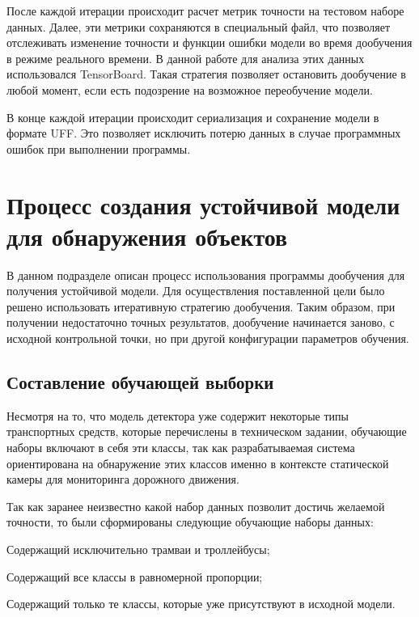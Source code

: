 После каждой итерации происходит расчет метрик точности на тестовом наборе данных. Далее, эти метрики сохраняются в специальный файл, что позволяет отслеживать изменение точности и функции ошибки модели во время дообучения в режиме реального времени. В данной работе для анализа этих данных использовался TensorBoard. Такая стратегия позволяет остановить дообучение в любой момент, если есть подозрение на возможное переобучение модели. 

В конце каждой итерации происходит сериализация и сохранение модели в формате UFF. Это позволяет исключить потерю данных в случае программных ошибок при выполнении программы.

\section{Процесс создания устойчивой модели для обнаружения объектов}

В данном подразделе описан процесс использования программы дообучения для получения устойчивой модели. Для осуществления поставленной цели было решено использовать итеративную стратегию дообучения. Таким образом, при получении недостаточно точных результатов, дообучение начинается заново, с исходной контрольной точки, но при другой конфигурации параметров обучения.

\subsection{Составление обучающей выборки}

Несмотря на то, что модель детектора уже содержит некоторые типы транспортных средств, которые перечислены в техническом задании, обучающие наборы включают в себя эти классы, так как разрабатываемая система ориентирована на обнаружение этих классов именно в контексте статической камеры для мониторинга дорожного движения. 

Так как заранее неизвестно какой набор данных позволит достичь желаемой точности, то были сформированы следующие обучающие наборы данных:

%
\begin{itemize*}
  \item Содержащий исключительно трамваи и троллейбусы;
  \item Содержащий все классы в равномерной пропорции;
  \item Содержащий только те классы, которые уже присутствуют в исходной модели.
\end{itemize*}
%

